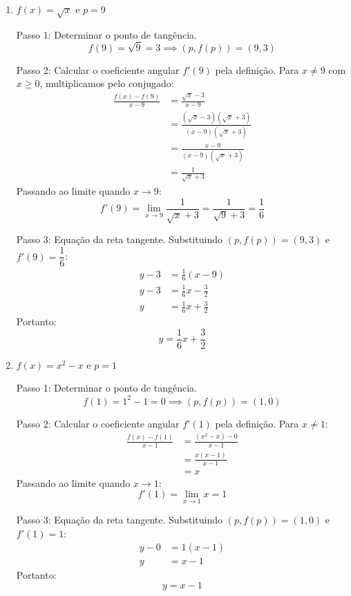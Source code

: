 \begin{enumerate}[label=\alph*)]
    \item $f(x) = \sqrt{x}$ e $p = 9$
    
    Passo 1: Determinar o ponto de tangência.
    \[
    f(9) = \sqrt{9} = 3 \implies (p, f(p)) = (9, 3)
    \]

    Passo 2: Calcular o coeficiente angular $f'(9)$ pela definição. Para $x \neq 9$ com $x \ge 0$, multiplicamos pelo conjugado:
    \begin{align*}
        \frac{f(x) - f(9)}{x - 9} &= \frac{\sqrt{x} - 3}{x - 9} \\[0.20cm]
        &= \frac{(\sqrt{x} - 3)(\sqrt{x} + 3)}{(x - 9)(\sqrt{x} + 3)} \\[0.20cm]
        &= \frac{x - 9}{(x - 9)(\sqrt{x} + 3)} \\[0.20cm]
        &= \frac{1}{\sqrt{x} + 3}
    \end{align*}
    Passando ao limite quando $x \to 9$:
    \[
    f'(9) = \lim_{x \to 9} \frac{1}{\sqrt{x} + 3} = \frac{1}{\sqrt{9} + 3} = \frac{1}{6}
    \]

    Passo 3: Equação da reta tangente. Substituindo $(p, f(p)) = (9, 3)$ e $f'(9) = \dfrac{1}{6}$:
    \begin{align*}
        y - 3 &= \frac{1}{6}(x - 9) \\[0.20cm]
        y - 3 &= \frac{1}{6}x - \frac{3}{2} \\[0.20cm]
        y &= \frac{1}{6}x + \frac{3}{2}
    \end{align*}
    Portanto:
    \[
    y = \frac{1}{6}x + \frac{3}{2}
    \]

    \item $f(x) = x^2 - x$ e $p = 1$
    
    Passo 1: Determinar o ponto de tangência.
    \[
    f(1) = 1^2 - 1 = 0 \implies (p, f(p)) = (1, 0)
    \]

    Passo 2: Calcular o coeficiente angular $f'(1)$ pela definição. Para $x \neq 1$:
    \begin{align*}
        \frac{f(x) - f(1)}{x - 1} &= \frac{(x^2 - x) - 0}{x - 1} \\[0.20cm]
        &= \frac{x(x - 1)}{x - 1} \\[0.20cm]
        &= x
    \end{align*}
    Passando ao limite quando $x \to 1$:
    \[
    f'(1) = \lim_{x \to 1} x = 1
    \]

    Passo 3: Equação da reta tangente. Substituindo $(p, f(p)) = (1, 0)$ e $f'(1) = 1$:
    \begin{align*}
        y - 0 &= 1(x - 1) \\[0.20cm]
        y &= x - 1
    \end{align*}
    Portanto:
    \[
    y = x - 1
    \]
\end{enumerate}

